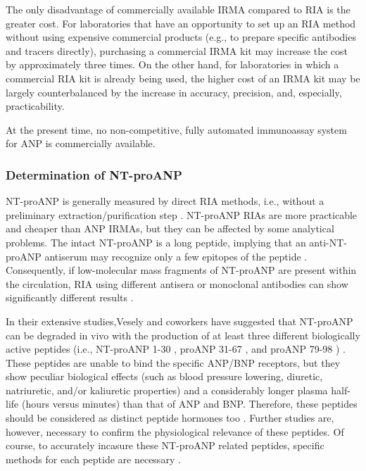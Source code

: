\documentclass[14pt,a4paper,onecolumn]{extarticle}
\begin{document}
The only disadvantage of commercially available IRMA compared to RIA is the
greater cost. For laboratories that have an opportunity to set up an RIA method without using expensive commercial products (e.g., to prepare specific antibodies and tracers directly), purchasing a commercial IRMA kit may increase the cost by approximately three times. On the other hand, for laboratories in which a commercial RIA kit
is already being used, the higher cost of an IRMA kit may be largely counterbalanced
by the increase in accuracy, precision, and, especially, practicability.

At the present time, no non-competitive, fully automated immunoassay system for
ANP is commercially available.

\subsubsection{ Determination of NT-proANP}

NT-proANP is generally measured by direct RIA methods, i.e., without a preliminary
extraction/purification step \citep{bib21} \citep{bib22} \citep{bib220} \citep{bib238} \citep{bib239} \citep{bib240}. NT-proANP RIAs are more practicable and
cheaper than ANP IRMAs, but they can be affected by some analytical problems. The
intact NT-proANP is a long peptide, implying that an anti-NT-proANP antiserum may
recognize only a few epitopes of the peptide \citep{bib21} \citep{bib22} \citep{bib239}. Consequently, if low-molecular
mass fragments of NT-proANP are present within the circulation, RIA using different
antisera or monoclonal antibodies can show significantly different results \citep{bib21} \citep{bib22}.

In their extensive studies,Vesely and coworkers have suggested that NT-proANP can
be degraded in vivo with the production of at least three different biologically active peptides (i.e., NT-proANP 1-30 , proANP 31-67 , and proANP 79-98 ) \citep{bib241} \citep{bib242} \citep{bib243} \citep{bib244} \citep{bib245} \citep{bib246}. These peptides are
unable to bind the specific ANP/BNP receptors, but they show peculiar biological effects
(such as blood pressure lowering, diuretic, natriuretic, and/or kaliuretic properties)
and a considerably longer plasma half-life (hours versus minutes) than that of ANP
and BNP. Therefore, these peptides should be considered as distinct peptide hormones
too \citep{bib246}. Further studies are, however, necessary to confirm the physiological relevance
of these peptides. Of course, to accurately incasure these NT-proANP related peptides,
specific methods for each peptide are necessary \citep{bib21}.
\end{document}
